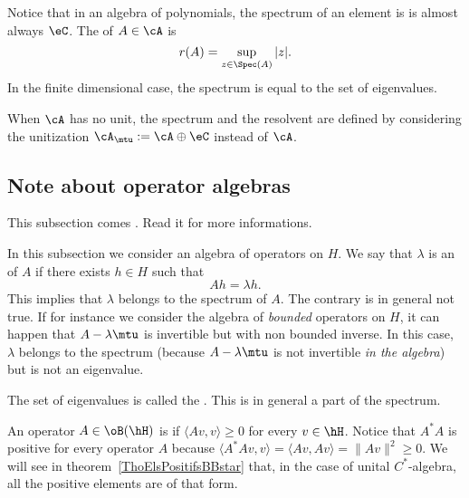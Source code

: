 Notice that in an algebra of polynomials, the spectrum of an element is is almost always $\eC$. The  of $A\in\cA$ is
\begin{equation}
   r(A)=\sup_{z\in\Spec(A)}|z|.
\end{equation} \label{def:spectre}
In the finite dimensional case, the spectrum is equal to the set of eigenvalues.

\begin{remark}
When $\cA$ has no unit, the spectrum and the resolvent are defined by considering the unitization $\cA_{\mtu}:=\cA\oplus\eC$ instead of $\cA$.
\end{remark}

\subsection{Note about operator algebras}

This subsection comes . Read it for more informations.

In this subsection we consider an algebra of operators on \( H\). We say that \( \lambda\) is an  of \( A\) if there exists \( h\in H\) such that
\begin{equation}
    Ah=\lambda h.
\end{equation}
This implies that \( \lambda\) belongs to the spectrum of \( A\). The contrary is in general not true. If for instance we consider the algebra of \emph{bounded} operators on \( H\), it can happen that \( A-\lambda\mtu\) is invertible but with non bounded inverse. In this case, \( \lambda\) belongs to the spectrum (because \( A-\lambda\mtu\) is not invertible \emph{in the algebra}) but is not an eigenvalue.

The set of eigenvalues is called the . This is in general a part of the spectrum.

An operator $A\in\oB(\hH)$ is  if $\langle Av, v\rangle \geq 0$ for every $v\in \hH$. Notice that $A^*A$ is positive for every operator $A$ because $\langle A^*Av, v\rangle =\langle Av, Av\rangle =\| Av \|^2\geq 0$. We will see in theorem~\ref{ThoElsPositifsBBstar} that, in the case of unital $C^*$-algebra, all the positive elements are of that form.

